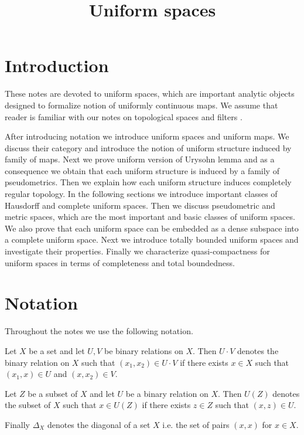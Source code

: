 \documentclass[10pt]{amsart}
\begin{document}
\title{Uniform spaces}
\date{}
\maketitle

\section{Introduction}
\noindent
These notes are devoted to uniform spaces, which are important analytic objects designed to formalize notion of uniformly continuous maps. We assume that reader is familiar with our notes on topological spaces \cite{Topological_spaces} and filters \cite{Filters_in_topology}.

After introducing notation we introduce uniform spaces and uniform maps. We discuss their category and introduce the notion of uniform structure induced by family of maps. Next we prove uniform version of Urysohn lemma and as a consequence we obtain that each uniform structure is induced by a family of pseudometrics. Then we explain how each uniform structure induces completely regular topology. In the following sections we introduce important classes of Hausdorff and complete uniform spaces. Then we discuss pseudometric and metric spaces, which are the most important and basic classes of uniform spaces. We also prove that each uniform space can be embedded as a dense subspace into a complete uniform space. Next we introduce totally bounded uniform spaces and investigate their properties. Finally we characterize quasi-compactness for uniform spaces in terms of completeness and total boundedness.

\section{Notation}

Throughout the notes we use the following notation. 

Let $X$ be a set and let $U, V$ be binary relations on $X$. Then $U \cdot V$ denotes the binary relation on $X$ such that $(x_1,x_2) \in U\cdot V$ if there exists $x\in X$ such that $(x_1, x)\in U$ and $(x,x_2)\in V$. 

Let $Z$ be a subset of $X$ and let $U$ be a binary relation on $X$. Then $U(Z)$ denotes the subset of $X$ such that $x \in U(Z)$ if there exists $z\in Z$ such that $(x, z)\in U$. 

Finally $\Delta_X$ denotes the diagonal of a set $X$ i.e. the set of pairs $(x,x)$ for $x \in X$.
\end{document}
